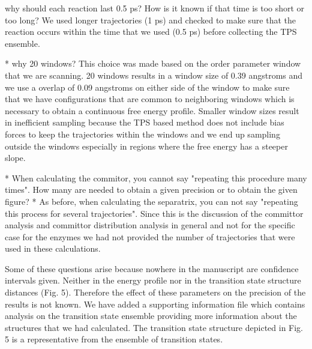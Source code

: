 \documentclass[journal=jpcbfk,manuscript=article,layout=traditional]{achemso}
\begin{document}
\begin{response}
  {why should each reaction last 0.5 ps? How is it known if that time is too short 
  or too long?}
We used longer trajectories (1 ps) and checked to make sure that the reaction occurs within
the time that we used (0.5 ps) before collecting the TPS ensemble. 

\end{response}

{\begin{response}
{* why 20 windows?}
This choice was made based on the order parameter window that we are scanning.
20 windows results in a window size of 0.39 angstroms and we use a overlap of
0.09 angstroms on either side of the window to make sure that we have configurations
that are common to neighboring windows which is necessary to obtain a continuous free energy
profile. Smaller window sizes result in inefficient sampling because the TPS based method
does not include bias forces to keep the trajectories within the windows and we end up
sampling outside the windows especially in regions where the free energy has a steeper slope.  
\end{response}

\begin{response}
{* When calculating the commitor, you cannot say "repeating this procedure many times". 
How many are needed to obtain a given precision or to obtain the given figure?
\newline
* As before, when calculating the separatrix, you can not say "repeating this 
process for several trajectories".}
Since this is the discussion of the committor analysis and committor distribution 
analysis in general and not for the specific case for the enzymes we had not
provided the number of trajectories that were used in these calculations.
\end{response}

\begin{response}{Some of these questions arise because nowhere in 
the manuscript are confidence intervals given. Neither in the energy 
profile nor in the transition state structure distances (Fig. 5). 
Therefore the effect of these parameters on the precision of the 
results is not known.
}
We have added a supporting information file which contains analysis on the transition
state ensemble providing more information about the structures that we had calculated. 
The transition state structure depicted in Fig. 5 is a representative
from the ensemble of transition states.
\end{response}

}
\end{document}
